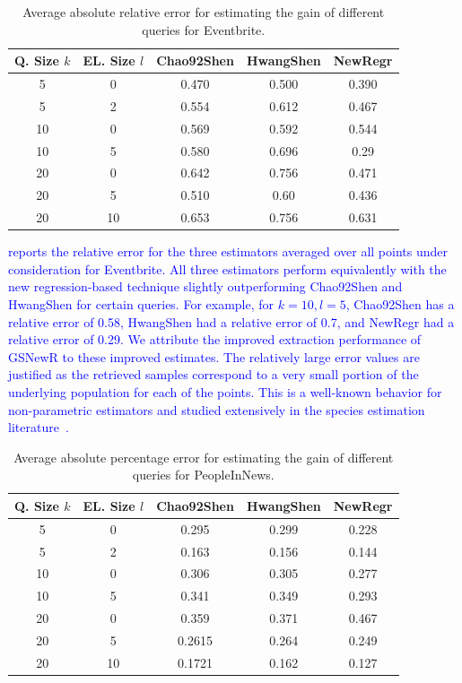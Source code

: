 \begin{table}[h]
\scriptsize \center
\vspace{-10pt}
\caption{Average absolute relative error for estimating the gain of different queries for Eventbrite.}
\label{tab:eventesterror}
\begin{tabular}{|c|c|c|c|c|}
\hline
\textbf{Q. Size $k$} & \textbf{EL. Size $l$} & \textbf{Chao92Shen} & \textbf{HwangShen} & \textbf{NewRegr} \\ \hline
5 & 0 & 0.470 & 0.500 & 0.390 \\
5 & 2 & 0.554 & 0.612 & 0.467\\
10 & 0 & 0.569 & 0.592 & 0.544\\
10 & 5 & 0.580 & 0.696 & 0.29\\
20 & 0 & 0.642 & 0.756 &0.471\\
20 & 5 & 0.510 & 0.60 & 0.436 \\
20 & 10 & 0.653 & 0.756 & 0.631\\
\hline
\end{tabular}
\end{table}

\textcolor{blue}{ reports the relative error for the three estimators averaged over all points under consideration for Eventbrite. All three estimators perform equivalently with the new regression-based technique slightly outperforming Chao92Shen and HwangShen for certain queries. For example, for $k = 10, l = 5$, Chao92Shen has a relative error of 0.58, HwangShen had a relative error of 0.7, and NewRegr had a relative error of 0.29. We attribute the improved extraction performance of GSNewR to these improved estimates. The relatively large error values are justified as the retrieved samples correspond to a very small portion of the underlying population for each of the points. This is a well-known behavior for non-parametric estimators and studied extensively in the species estimation literature~\cite{hwang:2010}.}

\begin{table}[h]
\scriptsize \center
\caption{Average absolute percentage error for estimating the gain of different queries for PeopleInNews.}
\label{tab:peopleesterror}
\begin{tabular}{|c|c|c|c|c|}
\hline
\textbf{Q. Size $k$} & \textbf{EL. Size $l$} & \textbf{Chao92Shen} & \textbf{HwangShen} & \textbf{NewRegr} \\ \hline
5 & 0 & 0.295 & 0.299 & 0.228\\
5 & 2 & 0.163 &  0.156 & 0.144\\
10 & 0 &  0.306 & 0.305 & 0.277\\
10 & 5 &  0.341 & 0.349 & 0.293\\
20 & 0 &  0.359& 0.371 & 0.467 \\
20 & 5 &  0.2615 & 0.264 & 0.249\\
20 & 10 & 0.1721 & 0.162 & 0.127\\
\hline
\end{tabular}
\end{table}

